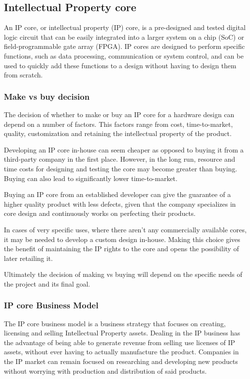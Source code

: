 
\subsection{Intellectual Property core}

An IP core, or intellectual property (IP) core, is a
pre-designed and tested digital logic circuit that can be easily integrated
into a larger system on a chip (SoC) or field-programmable gate array (FPGA).
IP cores are designed to perform specific functions, such as data processing,
communication or  system control, and can be used to quickly add these
functions to a design without having to design them from scratch.

\subsubsection{Make vs buy decision}
The decision of whether to make or buy an IP core for a hardware
design can depend on a number of factors. This factors range from cost,
time-to-market, quality, customization and retaining the intellectual
property of the product.

    Developing an IP core in-house can seem cheaper as opposed to
buying it from a third-party company in the first place. However, in the long
run, resource and time costs for designing and testing the core may become
greater than buying. Buying can also lead to significantly lower
time-to-market.

    Buying an IP core from an established developer can give the
guarantee of a higher quality product with less defects, given that the
company specializes in core design and continuously works on perfecting their
products.

    In cases of very specific uses, where there aren't any
commercially available cores, it may be needed to develop a custom design
in-house. Making this choice gives the benefit of maintaining the IP rights
to the core and opens the possibility of later retailing it.

    Ultimately the decision of making vs buying will depend on the
specific needs of the project and its final goal.

\subsubsection{IP core Business Model}
The IP core business model is a business strategy that focuses
on creating, licensing and selling Intellectual Property assets. Dealing in
the IP business has the advantage of being able to generate revenue from
selling use licenses of IP assets, without ever having to actually
manufacture the product. Companies in the IP market can remain focused on
researching and developing new products without worrying with production and
distribution of said products.

